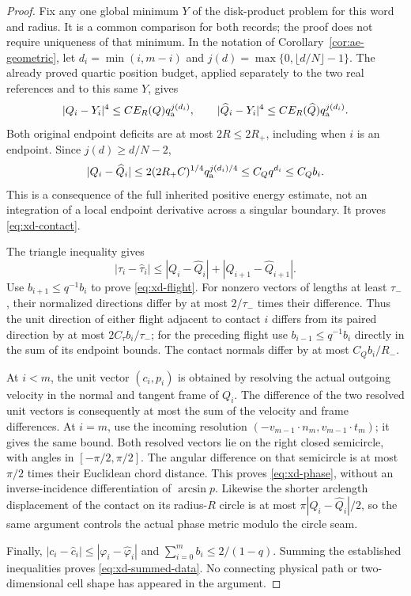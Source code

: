 \begin{proof}
Fix any one global minimum $Y$ of the disk-product problem for this
word and radius.  It is a common comparison for both records; the
proof does not require uniqueness of that minimum.  In the notation of
Corollary~\ref{cor:ae-geometric}, let
$d_i=\min(i,m-i)$ and
$j(d)=\max\{0,\lfloor d/N\rfloor-1\}$.
The already proved quartic position budget, applied separately to the
two real references and to this same $Y$, gives
\[
 |Q_i-Y_i|^4\le C E_R(Q)q_{\rm a}^{j(d_i)},\qquad
 |\widehat Q_i-Y_i|^4
                 \le C E_R(\widehat Q)q_{\rm a}^{j(d_i)}.
\]
Both original endpoint deficits are at most $2R\le2R_+$, including
when $i$ is an endpoint.  Since $j(d)\ge d/N-2$,
\[
 |Q_i-\widehat Q_i|
 \le2(2R_+C)^{1/4}q_{\rm a}^{j(d_i)/4}
 \le C_Q q^{d_i}\le C_Q b_i.
\]
This is a consequence of the full inherited positive energy estimate,
not an integration of a local endpoint derivative across a singular
boundary.  It proves \eqref{eq:xd-contact}.

The triangle inequality gives
\[
 |\tau_i-\widehat\tau_i|
 \le|Q_i-\widehat Q_i|+|Q_{i+1}-\widehat Q_{i+1}|.
\]
Use $b_{i+1}\le q^{-1}b_i$ to prove \eqref{eq:xd-flight}.
For nonzero vectors of lengths at least $\tau_-$, their normalized
directions differ by at most $2/\tau_-$ times their difference.
Thus the unit direction of either flight adjacent to contact $i$
differs from its paired direction by at most
$2C_\tau b_i/\tau_-$; for the preceding flight use
$b_{i-1}\le q^{-1}b_i$ directly in the sum of its endpoint bounds.
The contact normals differ by at most $C_Qb_i/R_-$.

At $i<m$, the unit vector $(c_i,p_i)$ is obtained by resolving the
actual outgoing velocity in the normal and tangent frame of $Q_i$.
The difference of the two resolved unit vectors is consequently at
most the sum of the velocity and frame differences.  At $i=m$, use
the incoming resolution $(-v_{m-1}\cdot n_m,v_{m-1}\cdot t_m)$;
it gives the same bound.  Both resolved vectors lie on the right
closed semicircle, with angles in $[-\pi/2,\pi/2]$.  The angular
difference on that semicircle is at most $\pi/2$ times their Euclidean
chord distance.  This proves \eqref{eq:xd-phase}, without an
inverse-incidence differentiation of $\arcsin p$.
Likewise the shorter arclength displacement of the contact on its
radius-$R$ circle is at most $\pi|Q_i-\widehat Q_i|/2$, so the same
argument controls the actual phase metric modulo the circle seam.

Finally, $|c_i-\widehat c_i|\le|\varphi_i-\widehat\varphi_i|$ and
$\sum_{i=0}^m b_i\le2/(1-q)$.  Summing the established inequalities
proves \eqref{eq:xd-summed-data}.  No connecting physical path or
two-dimensional cell shape has appeared in the argument.
\end{proof}

